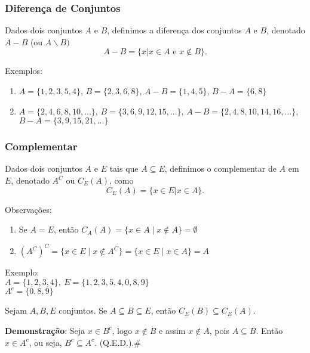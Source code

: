 \subsubsection{Diferen{\c c}a de Conjuntos}
\begin{definicao} Dados dois conjuntos $A$ e $B$, definimos a diferen{\c c}a dos conjuntos $A$ e $B$, denotado $A-B$ (ou $A\backslash B)$
\[A - B = \{x | x \in A \mbox{ e } x \notin B\}.\]
\end{definicao}

Exemplos:
\begin{enumerate}
\item $A=\{1,2,3,5,4\}$, $B=\{2,3,6,8\}$, $A-B=\{1,4,5\}$, $B-A=\{6,8\}$
\item $A=\{2,4,6,8,10,...\}$,  $B=\{3,6,9,12,15,...\}$, $A-B=\{2,4,8,10,14,16,...\}$, $B - A=\{3,9,15,21,...\}$
\end{enumerate}

\subsubsection{Complementar}

\begin{definicao}[Complementar] Dados dois conjuntos $A$ e $E$ tais que $A\subseteq E$, definimos o complementar de $A$ em $E$, denotado $A^{C}$ ou $C_{E}(A)$, como
\[C_{E}(A) = \{ x \in E | x \in A \}.\]
\end{definicao}

Observa{\c c}{\~o}es:
\begin{enumerate}
\item Se $A = E$, ent{\~a}o $C_{A}(A)=\{ x \in A \mid x \notin A \}=\emptyset$
\item $(A^{C})^{C}=\{x \in E \mid x \notin A^{C}\} = \{ x \in E \mid x \in A \}=A$
\end{enumerate}

Exemplo:\\
$A=\{1,2,3,4\},\ E=\{1,2,3,5,4,0,8,9\}$\\
$A^{c}=\{0,8,9\}$

\begin{proposicao} Sejam $A,B,E$ conjuntos. Se $A\subseteq B\subseteq E$, ent{\~a}o $C_{E}(B)\subseteq C_{E}(A)$.\end{proposicao}

\textbf{Demonstra{\c c}{\~a}o}: Seja $x\in B^{c}$, logo $x\notin B$ e assim $x\notin A$, pois $A\subseteq B$. Ent{\~a}o $x\in A^{c}$, ou seja, $B^{c}\subseteq A^{c}$. (Q.E.D.).\#\\

